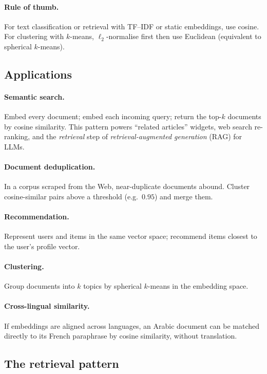 \paragraph{Rule of thumb.} For text classification or retrieval with TF--IDF or static embeddings, use cosine. For clustering with $k$-means, $\ell_2$-normalise first then use Euclidean (equivalent to spherical $k$-means).

\subsection{Applications}

\paragraph{Semantic search.} Embed every document; embed each incoming query; return the top-$k$ documents by cosine similarity. This pattern powers ``related articles'' widgets, web search re-ranking, and the \emph{retrieval} step of \emph{retrieval-augmented generation} (RAG) for LLMs.

\paragraph{Document deduplication.} In a corpus scraped from the Web, near-duplicate documents abound. Cluster cosine-similar pairs above a threshold (e.g.\ $0.95$) and merge them.

\paragraph{Recommendation.} Represent users and items in the same vector space; recommend items closest to the user's profile vector.

\paragraph{Clustering.} Group documents into $k$ topics by spherical $k$-means in the embedding space.

\paragraph{Cross-lingual similarity.} If embeddings are aligned across languages, an Arabic document can be matched directly to its French paraphrase by cosine similarity, without translation.

\subsection{The retrieval pattern}

